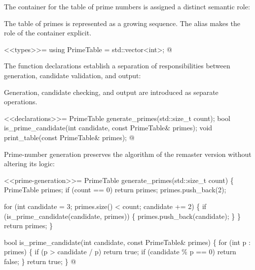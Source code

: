 \documentclass{ZGJournalArticle_2026}
\newenvironment{Shaded}{}{}
\newcommand{\NormalTok}[1]{#1}
\begin{document}
The container for the table of prime numbers is assigned a distinct
semantic role:

\begin{Shaded}
\begin{Highlighting}[]
\NormalTok{The table of primes is represented as a growing sequence.}
\NormalTok{The alias makes the role of the container explicit.}

\NormalTok{\textless{}\textless{}types\textgreater{}\textgreater{}=}
\NormalTok{using PrimeTable = std::vector\textless{}int\textgreater{};}
\NormalTok{@}
\end{Highlighting}
\end{Shaded}

The function declarations establish a separation of responsibilities
between generation, candidate validation, and output:

\begin{Shaded}
\begin{Highlighting}[]
\NormalTok{Generation, candidate checking, and output are introduced}
\NormalTok{as separate operations.}

\NormalTok{\textless{}\textless{}declarations\textgreater{}\textgreater{}=}
\NormalTok{PrimeTable generate\_primes(std::size\_t count);}
\NormalTok{bool is\_prime\_candidate(int candidate, const PrimeTable\& primes);}
\NormalTok{void print\_table(const PrimeTable\& primes);}
\NormalTok{@}
\end{Highlighting}
\end{Shaded}

Prime-number generation preserves the algorithm of the remaster version
without altering its logic:

\begin{Shaded}
\begin{Highlighting}[]
\NormalTok{\textless{}\textless{}prime{-}generation\textgreater{}\textgreater{}=}
\NormalTok{PrimeTable generate\_primes(std::size\_t count) \{}
\NormalTok{    PrimeTable primes;}
\NormalTok{    if (count == 0) return primes;}
\NormalTok{    primes.push\_back(2);}

\NormalTok{    for (int candidate = 3; primes.size() \textless{} count; candidate += 2) \{}
\NormalTok{        if (is\_prime\_candidate(candidate, primes)) \{}
\NormalTok{            primes.push\_back(candidate);}
\NormalTok{        \}}
\NormalTok{    \}}
\NormalTok{    return primes;}
\NormalTok{\}}

\NormalTok{bool is\_prime\_candidate(int candidate, const PrimeTable\& primes) \{}
\NormalTok{    for (int p : primes) \{}
\NormalTok{        if (p \textgreater{} candidate / p) return true;}
\NormalTok{        if (candidate \% p == 0) return false;}
\NormalTok{    \}}
\NormalTok{    return true;}
\NormalTok{\}}
\NormalTok{@}
\end{Highlighting}
\end{Shaded}
\end{document}
